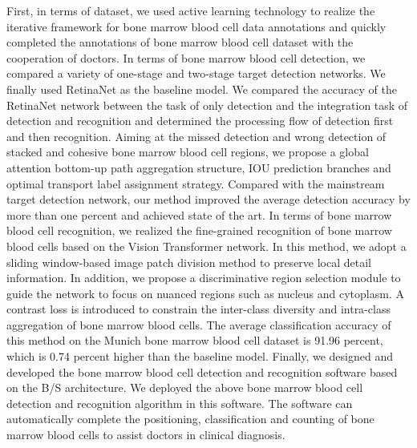 \begin{abstract*}
First, in terms of dataset, we used active learning technology to realize the iterative framework for bone marrow blood cell data 
annotations and quickly completed the annotations of bone marrow blood cell dataset with the cooperation of doctors.
In terms of bone marrow blood cell detection, we compared a variety of one-stage and two-stage target detection networks. 
We finally used RetinaNet as the baseline model. We compared the accuracy of the RetinaNet network between the task of only detection and the integration task of detection and recognition
and determined the processing flow of detection first and then recognition.
Aiming at the missed detection and wrong detection of stacked and cohesive bone marrow blood cell regions,
we propose a global attention bottom-up path aggregation structure, IOU prediction branches and optimal transport label assignment strategy.
Compared with the mainstream target detection network, our method
improved the average detection accuracy by more than one percent and achieved state of the art.
In terms of bone marrow blood cell recognition, we realized the fine-grained recognition of bone marrow blood cells based on the Vision Transformer network.
In this method, we adopt a sliding window-based image patch division method to preserve local detail information. 
In addition, we propose a discriminative region selection module to guide the network to focus on nuanced regions such as nucleus and cytoplasm. 
A contrast loss is introduced to constrain the inter-class diversity and intra-class aggregation of bone marrow blood cells.
The average classification accuracy of this method on the Munich bone marrow blood cell dataset is 91.96 percent, 
which is 0.74 percent higher than the baseline model.
Finally, we designed and developed the bone marrow blood cell detection and recognition software based on the B/S architecture.
We deployed the above bone marrow blood cell detection and recognition algorithm in this software. 
The software can automatically complete the positioning, 
classification and counting of bone marrow blood cells to assist doctors in clinical diagnosis.

\end{abstract*}
